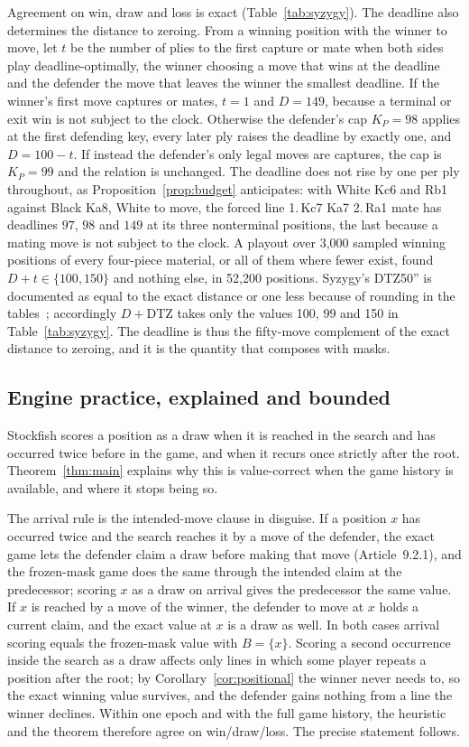 \documentclass[journal]{IEEEtran}
\theoremstyle{definition}
\theoremstyle{remark}
\begin{document}
Agreement on win, draw and loss is exact (Table~\ref{tab:syzygy}). The deadline also determines the distance to zeroing. From a winning position with the winner to move, let $t$ be the number of plies to the first capture or mate when both sides play deadline-optimally, the winner choosing a move that wins at the deadline and the defender the move that leaves the winner the smallest deadline. If the winner's first move captures or mates, $t=1$ and $D=149$, because a terminal or exit win is not subject to the clock. Otherwise the defender's cap $K_P=98$ applies at the first defending key, every later ply raises the deadline by exactly one, and $D=100-t$. If instead the defender's only legal moves are captures, the cap is $K_P=99$ and the relation is unchanged. The deadline does not rise by one per ply throughout, as Proposition~\ref{prop:budget} anticipates: with White Kc6 and Rb1 against Black Ka8, White to move, the forced line 1.\,Kc7 Ka7 2.\,Ra1 mate has deadlines $97$, $98$ and $149$ at its three nonterminal positions, the last because a mating move is not subject to the clock. A playout over 3{,}000 sampled winning positions of every four-piece material, or all of them where fewer exist, found $D+t\in\{100,150\}$ and nothing else, in 52{,}200 positions. Syzygy's DTZ50'' is documented as equal to the exact distance or one less because of rounding in the tables~\cite{syzygy}; accordingly $D+\mathrm{DTZ}$ takes only the values 100, 99 and 150 in Table~\ref{tab:syzygy}. The deadline is thus the fifty-move complement of the exact distance to zeroing, and it is the quantity that composes with masks.

\subsection{Engine practice, explained and bounded}\label{sec:engine}
Stockfish scores a position as a draw when it is reached in the search and has occurred twice before in the game, and when it recurs once strictly after the root. Theorem~\ref{thm:main} explains why this is value-correct when the game history is available, and where it stops being so.

The arrival rule is the intended-move clause in disguise. If a position $x$ has occurred twice and the search reaches it by a move of the defender, the exact game lets the defender claim a draw before making that move (Article~9.2.1), and the frozen-mask game does the same through the intended claim at the predecessor; scoring $x$ as a draw on arrival gives the predecessor the same value. If $x$ is reached by a move of the winner, the defender to move at $x$ holds a current claim, and the exact value at $x$ is a draw as well. In both cases arrival scoring equals the frozen-mask value with $B=\{x\}$. Scoring a second occurrence inside the search as a draw affects only lines in which some player repeats a position after the root; by Corollary~\ref{cor:positional} the winner never needs to, so the exact winning value survives, and the defender gains nothing from a line the winner declines. Within one epoch and with the full game history, the heuristic and the theorem therefore agree on win/draw/loss. The precise statement follows.
\end{document}
